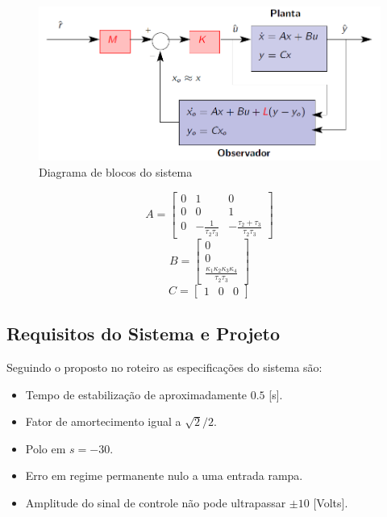 \documentclass{article}
\begin{document}
\begin{figure}[H]
	\centering
	\includegraphics[width=0.8\linewidth]{contrss}
	\caption{Diagrama de blocos do sistema}
	\label{fig:contrss}
\end{figure}

\begin{equation}
\label{eq:mata}
A=
\begin{bmatrix}
 0 & 1 & 0 \\
 0 & 0 & 1 \\
 0 & -\frac{1}{\tau_2\tau_3} & -\frac{\tau_2+\tau_3}{\tau_2\tau_3}
\end{bmatrix}
\end{equation}
\begin{equation}
\label{eq:matb}
B=
\begin{bmatrix}
0 \\
0 \\
\frac{\kappa_1\kappa_2\kappa_3\kappa_4}{\tau_2\tau_3}
\end{bmatrix}
\end{equation}
\begin{equation}
\label{eq:matc}
C=
\begin{bmatrix}
1 & 0 & 0
\end{bmatrix}
\end{equation}

\subsection{Requisitos do Sistema e Projeto}
Seguindo o proposto no roteiro \cite{bb:roteiro} as especificações do sistema são:
\begin{itemize}
	\item Tempo de estabilização de aproximadamente $0.5$ [s].
	\item Fator de amortecimento igual a $\sqrt{2}/2$.
	\item Polo em $s=-30$.
	\item Erro em regime permanente nulo a uma entrada rampa.
	\item Amplitude do sinal de controle não pode ultrapassar $\pm10$ [Volts].
\end{itemize}\
\end{document}
